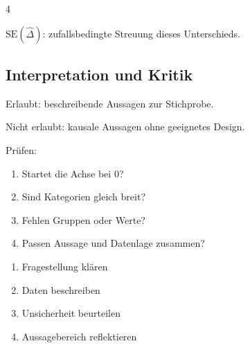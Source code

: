 \begin{landscape}
\begin{multicols*}{4}
\begin{cheatSheetBox}[title=Symbolübersicht (Gähn-Beispiel)]
$\mathrm{SE}(\hat{\Delta})$: zufallsbedingte Streuung dieses Unterschieds.
\end{cheatSheetBox}

\textcolor{\cheatSheetColor}{\subsection*{Interpretation und Kritik}}

\begin{cheatSheetBox}[title=Kontingenztabelle]
Erlaubt:
beschreibende Aussagen zur Stichprobe.

Nicht erlaubt:
kausale Aussagen ohne geeignetes Design.
\end{cheatSheetBox}

\begin{cheatSheetBox}[title=Grafiken kritisch lesen]
Prüfen:
\begin{enumerate}
\item Startet die Achse bei 0?
\item Sind Kategorien gleich breit?
\item Fehlen Gruppen oder Werte?
\item Passen Aussage und Datenlage zusammen?
\end{enumerate}
\end{cheatSheetBox}

\begin{cheatSheetBox}[title=Arbeitsprozess in 4 Schritten]
\begin{enumerate}
\item Fragestellung klären
\item Daten beschreiben
\item Unsicherheit beurteilen
\item Aussagebereich reflektieren
\end{enumerate}
\end{cheatSheetBox}


\end{multicols*}
\end{landscape}
\restoregeometry